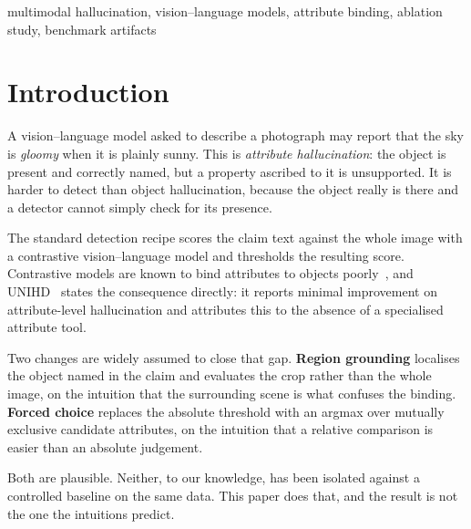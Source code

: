 \documentclass[conference]{IEEEtran}
\begin{document}
\begin{IEEEkeywords}
multimodal hallucination, vision--language models, attribute binding, ablation
study, benchmark artifacts
\end{IEEEkeywords}

\section{Introduction}

A vision--language model asked to describe a photograph may report that the sky
is \emph{gloomy} when it is plainly sunny. This is \emph{attribute
hallucination}: the object is present and correctly named, but a property
ascribed to it is unsupported. It is harder to detect than object
hallucination, because the object really is there and a detector cannot simply
check for its presence.

The standard detection recipe scores the claim text against the whole image with
a contrastive vision--language model and thresholds the resulting
score. Contrastive models are known to bind attributes to objects
poorly~\cite{yuksekgonul2023,thrush2022}, and UNIHD~\cite{chen2024} states the
consequence directly: it reports minimal improvement on attribute-level
hallucination and attributes this to the absence of a specialised attribute
tool.

Two changes are widely assumed to close that gap. \textbf{Region grounding}
localises the object named in the claim and evaluates the crop rather than the
whole image, on the intuition that the surrounding scene is what confuses the
binding. \textbf{Forced choice} replaces the absolute threshold with an argmax
over mutually exclusive candidate attributes, on the intuition that a relative
comparison is easier than an absolute judgement.

Both are plausible. Neither, to our knowledge, has been isolated against a
controlled baseline on the same data. This paper does that, and the result is not
the one the intuitions predict.
\end{document}
